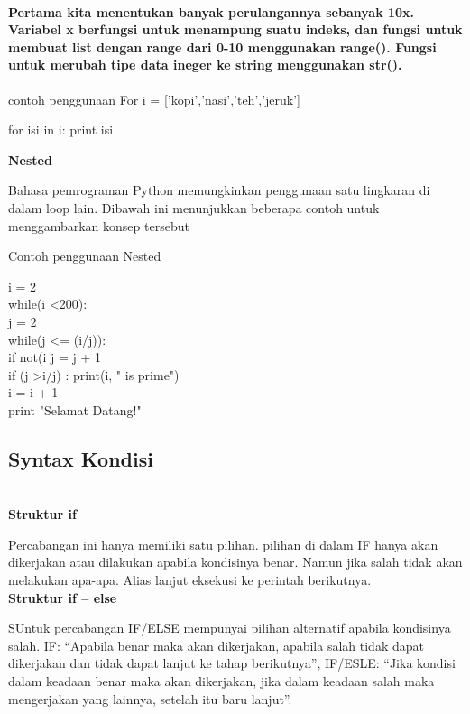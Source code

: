 \documentclass{article}
\begin{document}
\paragraph{Pertama kita menentukan banyak perulangannya sebanyak 10x. Variabel x berfungsi untuk menampung suatu indeks, dan fungsi untuk membuat list dengan range dari 0-10 menggunakan range(). Fungsi untuk merubah tipe data ineger ke string menggunakan str().}

contoh penggunaan For
i = ['kopi','nasi','teh','jeruk']

for isi in i:
    print isi
    
\item \textbf{Nested}

\item Bahasa pemrograman Python memungkinkan penggunaan satu lingkaran di dalam loop lain. Dibawah ini menunjukkan beberapa contoh untuk menggambarkan konsep tersebut

Contoh penggunaan Nested

i = 2\\
while(i \textless 200):\\
    j = 2\\
    while(j \textless= (i/j)):\\
        if not(i%
        j = j + 1\\
    if (j \textgreater i/j) : print(i, " is prime")\\
    i = i + 1\\

print "Selamat Datang!"

    \subsection {Syntax Kondisi}\\
    \textbf{Struktur if}
    \item Percabangan ini hanya memiliki satu pilihan. pilihan di dalam IF hanya akan dikerjakan atau dilakukan apabila kondisinya benar. Namun jika salah tidak akan melakukan apa-apa. Alias lanjut eksekusi ke perintah berikutnya.\\
    
    \textbf{Struktur if – else}
    \item SUntuk percabangan IF/ELSE mempunyai pilihan alternatif apabila kondisinya salah.
    IF: “Apabila benar maka akan dikerjakan, apabila salah  tidak dapat dikerjakan dan tidak dapat lanjut ke tahap berikutnya”,
    IF/ESLE: “Jika kondisi dalam keadaan benar maka akan dikerjakan, jika dalam keadaan salah maka mengerjakan yang lainnya, setelah itu  baru lanjut”.
\end{document}
